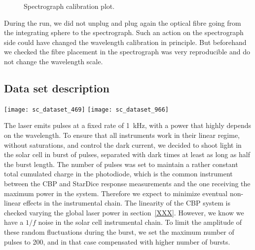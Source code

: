 \documentclass[onecolumn]{aa}
\newcommand{\SD}{StarDice }
\begin{document}
\begin{figure}[!h]
\centering
\caption{Spectrograph calibration plot.}
\end{figure}


During the run, we did not unplug and plug again the optical fibre going from the integrating sphere to the spectrograph. Such an action on the spectrograph side could have changed the wavelength calibration in principle. But beforehand we checked the fibre placement in the spectrograph was very reproducible and do not change the wavelength scale.
 

\subsection{Data set description}


\begin{figure*}[!h]
\centering
\texttt{[image: sc\_dataset\_469]}
\texttt{[image: sc\_dataset\_966]}
\caption{From top to bottom: typical data sets for digital analyzer (pin state 4 is the Keithley output, pin state 2 the laser trigger output, pin state 1 the Keysight start and end time acquisition time stamps), charges in the photodiode, charges in the solar cell, flux in the spectrograph. Left: typical data set at \SI{469}{\nm}. Right: typical data set at \SI{966}{\nm}.}\label{fig:sc_dataset_examples}
\end{figure*}

The laser emits pulses at a fixed rate of \SI{1}{\kilo\hertz}, with a power that highly depends on the wavelength. To ensure that all instruments work in their linear regime, without saturations, and control the dark current, we decided to shoot light in the solar cell in burst of pulses, separated with dark times at least as long as half the burst length. The number of pulses was set to maintain a rather constant total cumulated charge in the photodiode, which is the common instrument between the CBP and \SD response measurements and the one receiving the maximum power in the system. Therefore we expect to minimize eventual non-linear effects in the instrumental chain. The linearity of the CBP system is checked varying the global laser power in section~\ref{XXX}. However, we know we have a $1/f$ noise in the solar cell instrumental chain. To limit the amplitude of these random fluctuations during the burst, we set the maximum number of pulses to 200, and in that case compensated with higher number of bursts.
\end{document}
